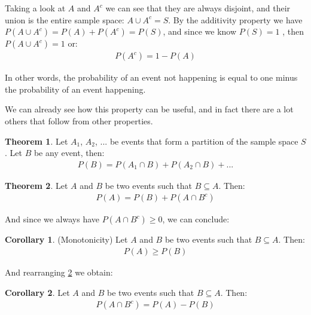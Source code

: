 \documentclass[
  oneside,
  11pt, a4paper,
  footinclude=true,
  headinclude=true,
  cleardoublepage=empty
]{scrbook}
\theoremstyle{definition}
\theoremstyle{definition}
\newtheorem{theorem}{Theorem}[section]
\newtheorem{corollary}{Corollary}[theorem]
\begin{document}
            Taking a look at $A$ and $A^c$ we can see that they are always disjoint, and their union is the entire sample space: $A \cup A^c = S$. By the additivity property we have $P(A \cup A^c) = P(A) + P(A^c) = P(S)$, and since we know $P(S) = 1$ , then $P(A \cup A^c) = 1$ or:
            \begin{align}
                P(A^c) = 1 - P(A)
            \end{align}{}
            
            In other words, the probability of an event not happening is equal to one minus the probability of an event happening.
            
            We can already see how this property can be useful, and in fact there are a lot others that follow from other properties.
            
            \begin{theorem}{Let $A_1$, $A_2$, ... be events that form a partition of the sample space $S$. Let $B$ be any event, then:}
                \begin{align*}
                    P(B) = P(A_1 \cap B) + P(A_2 \cap B) + ...
                \end{align*}{}
            \end{theorem}
            
            \begin{theorem}{Let $A$ and $B$ be two events such that $B \subseteq A$. Then:}\label{2-1-3}
                \begin{align*}
                    P(A) = P(B) + P(A \cap B^c)
                \end{align*}{}
            \end{theorem}
            
            And since we always have $P(A \cap B^c) \geq 0$, we can conclude:
            \begin{corollary}{(Monotonicity) Let $A$ and $B$ be two events such that $B \subseteq A$. Then:}
                \begin{align*}
                    P(A) \geq P(B)
                \end{align*}{}
            \end{corollary}
            
            And rearranging \ref{2-1-3} we obtain:
            \begin{corollary}{Let $A$ and $B$ be two events such that $B \subseteq A$. Then:}
                \begin{align*}
                    P(A \cap B^c) = P(A) - P(B)
                \end{align*}{}
            \end{corollary}
            
\end{document}
